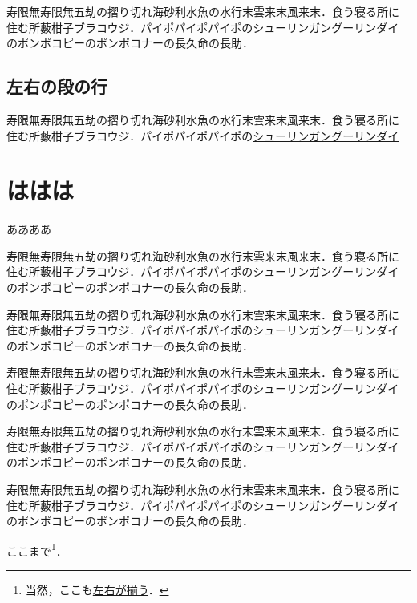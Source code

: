 \documentclass[a4j, 12Q, twocolumn, twoside, draft]{jsarticle}
\begin{document}
寿限無寿限無五劫の摺り切れ海砂利水魚の水行末雲来末風来末．食う寝る所に
住む所藪柑子ブラコウジ．パイポパイポパイポのシューリンガングーリンダイ
のポンポコピーのポンポコナーの長久命の長助．

\subsection{左右の段の行}


寿限無寿限無五劫の摺り切れ海砂利水魚の水行末雲来末風来末．食う寝る所に
住む所藪柑子ブラコウジ．パイポパイポパイポの\underline{シューリンガングーリンダイ}


\section{ははは}
ああああ

寿限無寿限無五劫の摺り切れ海砂利水魚の水行末雲来末風来末．食う寝る所に
住む所藪柑子ブラコウジ．パイポパイポパイポのシューリンガングーリンダイ
のポンポコピーのポンポコナーの長久命の長助．

寿限無寿限無五劫の摺り切れ海砂利水魚の水行末雲来末風来末．食う寝る所に
住む所藪柑子ブラコウジ．パイポパイポパイポのシューリンガングーリンダイ
のポンポコピーのポンポコナーの長久命の長助．

寿限無寿限無五劫の摺り切れ海砂利水魚の水行末雲来末風来末．食う寝る所に
住む所藪柑子ブラコウジ．パイポパイポパイポのシューリンガングーリンダイ
のポンポコピーのポンポコナーの長久命の長助．

寿限無寿限無五劫の摺り切れ海砂利水魚の水行末雲来末風来末．食う寝る所に
住む所藪柑子ブラコウジ．パイポパイポパイポのシューリンガングーリンダイ
のポンポコピーのポンポコナーの長久命の長助．

寿限無寿限無五劫の摺り切れ海砂利水魚の水行末雲来末風来末．食う寝る所に
住む所藪柑子ブラコウジ．パイポパイポパイポのシューリンガングーリンダイ
のポンポコピーのポンポコナーの長久命の長助．

ここまで\footnote{当然，ここも\underline{左右が揃う}．}．
\end{document}
